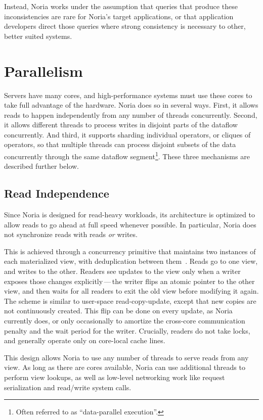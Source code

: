 Instead, Noria works under the assumption that queries that produce these
inconsistencies are rare for Noria's target applications, or that application
developers direct those queries where strong consistency is necessary to other,
better suited systems.

\section{Parallelism}
\label{s:parallel}

Servers have many cores, and high-performance systems must use these cores to
take full advantage of the hardware. Noria does so in several ways. First, it
allows reads to happen independently from any number of threads concurrently.
Second, it allows different threads to process writes in disjoint parts of the
dataflow concurrently. And third, it supports sharding individual operators, or
cliques of operators, so that multiple threads can process disjoint subsets of
the data concurrently through the same dataflow segment\footnote{Often referred
to as ``data-parallel execution''.}. These three mechanisms are described
further below.

\subsection{Read Independence}

Since Noria is designed for read-heavy workloads, its architecture is optimized
to allow reads to go ahead at full speed whenever possible. In particular, Noria
does not synchronize reads with reads \emph{or} writes.

This is achieved through a concurrency primitive that maintains two instances of
each materialized view, with deduplication between them~\cite{evmap}. Reads go
to one view, and writes to the other. Readers see updates to the view only when
a writer exposes those changes explicitly\,---\,the writer flips an atomic
pointer to the other view, and then waits for all readers to exit the old view
before modifying it again. The scheme is similar to user-space read-copy-update,
except that new copies are not continuously created. This flip can be done on
every update, as Noria currently does, or only occasionally to amortize the
cross-core communication penalty and the wait period for the writer. Crucially,
readers do not take locks, and generally operate only on core-local cache lines.

This design allows Noria to use any number of threads to serve reads from any
view. As long as there are cores available, Noria can use additional threads to
perform view lookups, as well as low-level networking work like request
serialization and read/write system calls.

